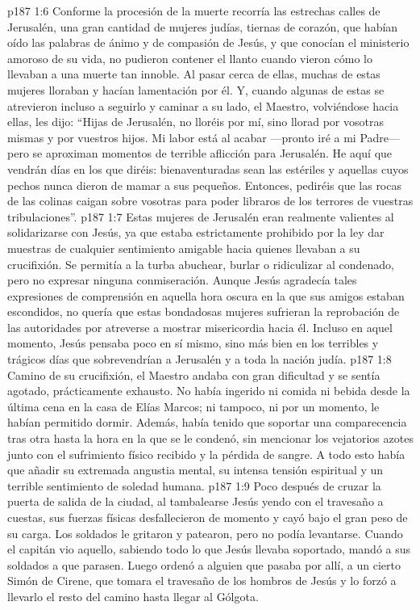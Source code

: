 \vs p187 1:6 \pc Conforme la procesión de la muerte recorría las estrechas calles de Jerusalén, una gran cantidad de mujeres judías, tiernas de corazón, que habían oído las palabras de ánimo y de compasión de Jesús, y que conocían el ministerio amoroso de su vida, no pudieron contener el llanto cuando vieron cómo lo llevaban a una muerte tan innoble. Al pasar cerca de ellas, muchas de estas mujeres lloraban y hacían lamentación por él. Y, cuando algunas de estas se atrevieron incluso a seguirlo y caminar a su lado, el Maestro, volviéndose hacia ellas, les dijo: “Hijas de Jerusalén, no lloréis por mí, sino llorad por vosotras mismas y por vuestros hijos. Mi labor está al acabar ---pronto iré a mi Padre--- pero se aproximan momentos de terrible aflicción para Jerusalén. He aquí que vendrán días en los que diréis: bienaventuradas sean las estériles y aquellas cuyos pechos nunca dieron de mamar a sus pequeños. Entonces, pediréis que las rocas de las colinas caigan sobre vosotras para poder libraros de los terrores de vuestras tribulaciones”.
\vs p187 1:7 Estas mujeres de Jerusalén eran realmente valientes al solidarizarse con Jesús, ya que estaba estrictamente prohibido por la ley dar muestras de cualquier sentimiento amigable hacia quienes llevaban a su crucifixión. Se permitía a la turba abuchear, burlar o ridiculizar al condenado, pero no expresar ninguna conmiseración. Aunque Jesús agradecía tales expresiones de comprensión en aquella hora oscura en la que sus amigos estaban escondidos, no quería que estas bondadosas mujeres sufrieran la reprobación de las autoridades por atreverse a mostrar misericordia hacia él. Incluso en aquel momento, Jesús pensaba poco en sí mismo, sino más bien en los terribles y trágicos días que sobrevendrían a Jerusalén y a toda la nación judía.
\vs p187 1:8 Camino de su crucifixión, el Maestro andaba con gran dificultad y se sentía agotado, prácticamente exhausto. No había ingerido ni comida ni bebida desde la última cena en la casa de Elías Marcos; ni tampoco, ni por un momento, le habían permitido dormir. Además, había tenido que soportar una comparecencia tras otra hasta la hora en la que se le condenó, sin mencionar los vejatorios azotes junto con el sufrimiento físico recibido y la pérdida de sangre. A todo esto había que añadir su extremada angustia mental, su intensa tensión espiritual y un terrible sentimiento de soledad humana.
\vs p187 1:9 Poco después de cruzar la puerta de salida de la ciudad, al tambalearse Jesús yendo con el travesaño a cuestas, sus fuerzas físicas desfallecieron de momento y cayó bajo el gran peso de su carga. Los soldados le gritaron y patearon, pero no podía levantarse. Cuando el capitán vio aquello, sabiendo todo lo que Jesús llevaba soportado, mandó a sus soldados a que parasen. Luego ordenó a alguien que pasaba por allí, a un cierto Simón de Cirene, que tomara el travesaño de los hombros de Jesús y lo forzó a llevarlo el resto del camino hasta llegar al Gólgota.
